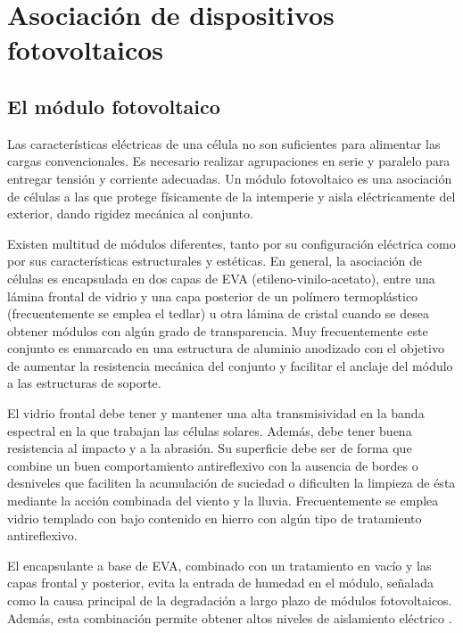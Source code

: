 
\chapter{Asociación de dispositivos fotovoltaicos\label{cha:AsociacionDispositivos}}


\section{El módulo fotovoltaico}

Las características eléctricas de una célula no son suficientes para
alimentar las cargas convencionales. Es necesario realizar agrupaciones
en serie y paralelo para entregar tensión y corriente adecuadas. Un
módulo fotovoltaico es una asociación de células a las que protege
físicamente de la intemperie y aisla eléctricamente del exterior,
dando rigidez mecánica al conjunto. 

Existen multitud de módulos diferentes, tanto por su configuración
eléctrica como por sus características estructurales y estéticas.
En general, la asociación de células es encapsulada en dos capas de
EVA (etileno-vinilo-acetato), entre una lámina frontal de vidrio y
una capa posterior de un polímero termoplástico (frecuentemente se
emplea el tedlar) u otra lámina de cristal cuando se desea obtener
módulos con algún grado de transparencia. Muy frecuentemente este
conjunto es enmarcado en una estructura de aluminio anodizado con
el objetivo de aumentar la resistencia mecánica del conjunto y facilitar
el anclaje del módulo a las estructuras de soporte.

El vidrio frontal debe tener y mantener una alta transmisividad en
la banda espectral en la que trabajan las células solares. Además,
debe tener buena resistencia al impacto y a la abrasión. Su superficie
debe ser de forma que combine un buen comportamiento antireflexivo
con la ausencia de bordes o desniveles que faciliten la acumulación
de suciedad o dificulten la limpieza de ésta mediante la acción combinada
del viento y la lluvia. Frecuentemente se emplea vidrio templado con
bajo contenido en hierro con algún tipo de tratamiento antireflexivo.

El encapsulante a base de EVA, combinado con un tratamiento en vacío
y las capas frontal y posterior, evita la entrada de humedad en el
módulo, señalada como la causa principal de la degradación a largo
plazo de módulos fotovoltaicos. Además, esta combinación permite obtener
altos niveles de aislamiento eléctrico \cite{Wenham.Green.ea2000}. 


